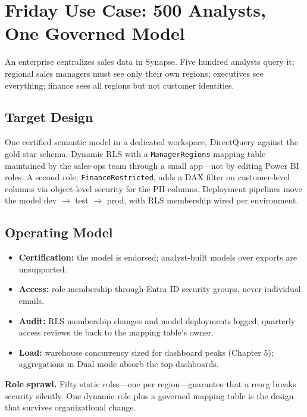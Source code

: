 \section{Friday Use Case: 500 Analysts, One Governed Model}
An enterprise centralizes sales data in Synapse. Five hundred analysts query it; regional sales managers must see only their own regions; executives see everything; finance sees all regions but not customer identities.

\subsection{Target Design}
One certified semantic model in a dedicated workspace, DirectQuery against the gold star schema. Dynamic RLS with a \texttt{ManagerRegions} mapping table maintained by the sales-ops team through a small app---not by editing Power BI roles. A second role, \texttt{FinanceRestricted}, adds a DAX filter on customer-level columns via object-level security for the PII columns. Deployment pipelines move the model dev $\rightarrow$ test $\rightarrow$ prod, with RLS membership wired per environment.

\subsection{Operating Model}
\begin{itemize}
    \item \textbf{Certification:} the model is endorsed; analyst-built models over exports are unsupported.
    \item \textbf{Access:} role membership through Entra ID security groups, never individual emails.
    \item \textbf{Audit:} RLS membership changes and model deployments logged; quarterly access reviews tie back to the mapping table's owner.
    \item \textbf{Load:} warehouse concurrency sized for dashboard peaks (Chapter 5); aggregations in Dual mode absorb the top dashboards.
\end{itemize}

\begin{pitfall}
\textbf{Role sprawl.} Fifty static roles---one per region---guarantee that a reorg breaks security silently. One dynamic role plus a governed mapping table is the design that survives organizational change.
\end{pitfall}

